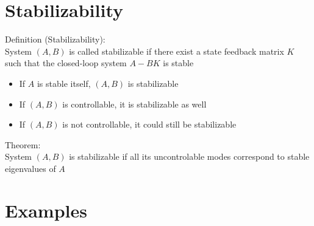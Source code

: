 \documentclass[10pt,a4paper,oneside]{article}
\begin{document}
\section{Stabilizability}
Definition (Stabilizability):\\
System $(A,B)$ is called stabilizable if there exist a state feedback matrix $K$ such that the closed-loop system $A-BK$ is stable
\begin{itemize}
\item If $A$ is stable itself, $(A, B)$ is stabilizable
\item If $(A, B)$ is controllable, it is stabilizable as well
\item If $(A, B)$ is not controllable, it could still be stabilizable
\end{itemize}
Theorem:\\
System $(A, B)$ is stabilizable if all its uncontrolable modes correspond to stable eigenvalues of $A$
\section{Examples}
\end{document}
